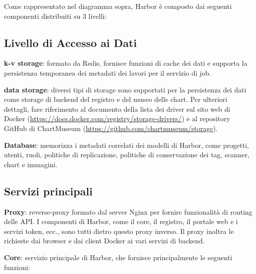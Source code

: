 \documentclass[12pt,a4paper]{report}
\begin{document}
Come rappresentato nel diagramma sopra, Harbor è composto dai seguenti componenti distribuiti su 3 livelli:

\subsection{Livello di Accesso ai Dati}

\textbf{k-v storage}: formato da Redis, fornisce funzioni di cache dei dati e supporta la persistenza temporanea dei metadati dei lavori per il servizio di job.

\textbf{data storage}: diversi tipi di storage sono supportati per la persistenza dei dati come storage di backend del registro e del museo delle chart. Per ulteriori dettagli, fare riferimento al documento della lista dei driver sul sito web di Docker (\url{https://docs.docker.com/registry/storage-drivers/}) e al repository GitHub di ChartMuseum (\url{https://github.com/chartmuseum/storage}).

\textbf{Database}: memorizza i metadati correlati dei modelli di Harbor, come progetti, utenti, ruoli, politiche di replicazione, politiche di conservazione dei tag, scanner, chart e immagini.

\subsection{Servizi principali}

\textbf{Proxy}: reverse-proxy formato dal server Nginx per fornire funzionalità di routing delle API. I componenti di Harbor, come il core, il registro, il portale web e i servizi token, ecc., sono tutti dietro questo proxy inverso. Il proxy inoltra le richieste dai browser e dai client Docker ai vari servizi di backend.

\textbf{Core}: servizio principale di Harbor, che fornisce principalmente le seguenti funzioni:
\end{document}
